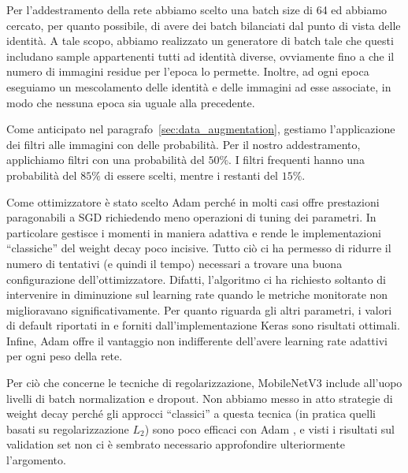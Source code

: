 Per l'addestramento della rete abbiamo scelto una batch size di 64 ed abbiamo cercato, per quanto possibile, di avere dei batch bilanciati dal punto di vista delle identità. A tale scopo, abbiamo realizzato un generatore di batch tale che questi includano sample appartenenti tutti ad identità diverse, ovviamente fino a che il numero di immagini residue per l'epoca lo permette. Inoltre, ad ogni epoca eseguiamo un mescolamento delle identità e delle immagini ad esse associate, in modo che nessuna epoca sia uguale alla precedente.

Come anticipato nel paragrafo~\ref{sec:data_augmentation}, gestiamo l'applicazione dei filtri alle immagini con delle probabilità. Per il nostro addestramento, applichiamo filtri con una probabilità del $50\%$. I filtri frequenti hanno una probabilità del $85\%$ di essere scelti, mentre i restanti del $15\%$. 

Come ottimizzatore è stato scelto Adam \cite{adam} perché in molti casi offre prestazioni paragonabili a SGD richiedendo meno operazioni di tuning dei parametri. In particolare gestisce i momenti in maniera adattiva e rende le implementazioni ``classiche'' del weight decay poco incisive. Tutto ciò ci ha permesso di ridurre il numero di tentativi (e quindi il tempo) necessari a trovare una buona configurazione dell'ottimizzatore. Difatti, l'algoritmo ci ha richiesto soltanto di intervenire in diminuzione sul learning rate quando le metriche monitorate non miglioravano significativamente. 
Per quanto riguarda gli altri parametri, i valori di default riportati in \cite{adam} e forniti dall'implementazione Keras sono risultati ottimali. Infine, Adam offre il vantaggio non indifferente dell'avere learning rate adattivi per ogni peso della rete.

Per ciò che concerne le tecniche di regolarizzazione, MobileNetV3 include all'uopo livelli di batch normalization e dropout. Non abbiamo messo in atto strategie di weight decay perché gli approcci ``classici'' a questa tecnica (in pratica quelli basati su regolarizzazione $L_2$) sono poco efficaci con Adam \cite{adam_no_wd}, e visti i risultati sul validation set non ci è sembrato necessario approfondire ulteriormente l'argomento. 

